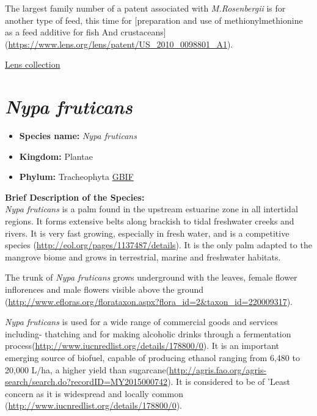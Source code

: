 \documentclass[]{book}
\providecommand{\tightlist}{%
  \setlength{\itemsep}{0pt}\setlength{\parskip}{0pt}}
\theoremstyle{definition}
\theoremstyle{definition}
\theoremstyle{definition}
\theoremstyle{remark}
\begin{document}
The largest family number of a patent associated with
\emph{M.Rosenbergii} is for another type of feed, this time for
{[}preparation and use of methionylmethionine as a feed additive for
fish And crustaceans{]}
(\url{https://www.lens.org/lens/patent/US_2010_0098801_A1}).

\href{https://www.lens.org/lens/collection/24802}{Lens collection}

\hypertarget{nypa-fruticans}{%
\section{\texorpdfstring{\emph{Nypa
fruticans}}{Nypa fruticans}}\label{nypa-fruticans}}

\begin{itemize}
\tightlist
\item
  \textbf{Species name:} \emph{Nypa fruticans}
\item
  \textbf{Kingdom:} Plantae
\item
  \textbf{Phylum:} Tracheophyta
  \href{https://www.gbif.org/species/2738422}{GBIF}
\end{itemize}

\textbf{Brief Description of the Species:}\\
\emph{Nypa fruticans} is a palm found in the upstream estuarine zone in
all intertidal regions. It forms extensive belts along brackish to tidal
freshwater creeks and rivers. It is very fast growing, especially in
fresh water, and is a competitive species
(\url{http://eol.org/pages/1137487/details}). It is the only palm
adapted to the mangrove biome and grows in terrestrial, marine and
freshwater habitats.

The trunk of \emph{Nypa fruticans} grows underground with the leaves,
female flower inflorences and male flowers visible above the ground
(\url{http://www.efloras.org/florataxon.aspx?flora_id=2\&taxon_id=220009317}).

\emph{Nypa fruticans} is used for a wide range of commercial goods and
services including- thatching and for making alcoholic drinks through a
fermentation process(\url{http://www.iucnredlist.org/details/178800/0}).
It is an important emerging source of biofuel, capable of producing
ethanol ranging from 6,480 to 20,000 L/ha, a higher yield than
sugarcane(\url{http://agris.fao.org/agris-search/search.do?recordID=MY2015000742}).
It is considered to be of 'Least concern as it is widespread and locally
common (\url{http://www.iucnredlist.org/details/178800/0}).
\end{document}
